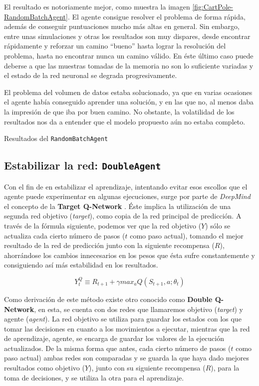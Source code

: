 El resultado es notoriamente mejor, como muestra la imagen \ref{fig:CartPole-RandomBatchAgent}. El agente consigue resolver el problema de forma rápida, además de conseguir puntuaciones mucho más altas en general. Sin embargo, entre unas simulaciones y otras los resultados son muy dispares, desde encontrar rápidamente y reforzar un camino ``bueno'' hasta lograr la resolución del problema, hasta no encontrar nunca un camino válido. En éste último caso puede deberse a que las muestras tomadas de la memoria no son lo suficiente variadas y el estado de la red neuronal se degrada progresivamente.

El problema del volumen de datos estaba solucionado, ya que en varias ocasiones el agente había conseguido aprender una solución, y en las que no, al menos daba la impresión de que iba por buen camino. No obstante, la volatilidad de los resultados nos da a entender que el modelo propuesto aún no estaba completo.

%
       {Resultados del \texttt{RandomBatchAgent}}


\subsection{Estabilizar la red: \texttt{DoubleAgent}}
\label{sec:DA}

Con el fin de en estabilizar el aprendizaje, intentando evitar esos escollos que el agente puede experimentar en algunas ejecuciones, surge por parte de \textit{DeepMind} el concepto de la \textbf{Target Q-Network} \citep{NIPS2010_3964}. Éste implica la utilización de una segunda red objetivo (\textit{target}), como copia de la red principal de predicción. A través de la fórmula siguiente, podemos ver que la red objetivo ($Y$) sólo se actualiza cada cierto número de pasos ($t$ como paso actual), tomando el mejor resultado de la red de predicción junto con la siguiente recompensa ($R$), ahorrándose los cambios innecesarios en los pesos que ésta sufre constantemente y consiguiendo así más estabilidad en los resultados. 

$$Y^Q_{t} \equiv R_{t+1} + \gamma max_{a} Q(S_{t+1}, a; \theta_{t})$$

Como derivación de este método existe otro conocido como \textbf{Double Q-Network}, en esta, se cuenta con dos redes que llamaremos objetivo (\textit{target}) y agente (\textit{agent}). La red objetivo se utiliza para guardar los estados con los que tomar las decisiones en cuanto a los movimientos a ejecutar, mientras que la red de aprendizaje, agente, se encarga de guardar los valores de la ejecución actualizados. De la misma forma que antes, cada cierto número de pasos ($t$ como paso actual) ambas redes son comparadas y se guarda la que haya dado mejores resultados como objetivo ($Y$), junto con su siguiente recompensa ($R$), para la toma de decisiones, y se utiliza la otra para el aprendizaje.

